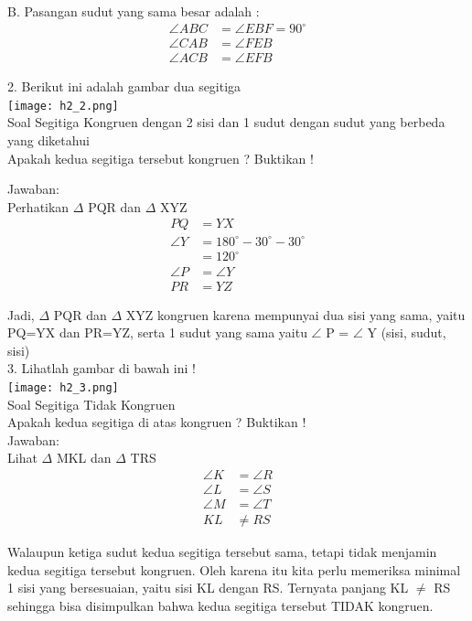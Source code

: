 \documentclass[11pt,fleqn]{book} %
\begin{document}
B. Pasangan sudut yang sama besar adalah :
    \begin{align*} \angle ABC &= \angle EBF = 90^{\circ} \\ \angle CAB &= \angle FEB \\ \angle ACB &= \angle EFB \end{align*}


2. Berikut ini adalah gambar dua segitiga\\
\texttt{[image: h2\_2.png]}\\
Soal Segitiga Kongruen dengan 2 sisi dan 1 sudut dengan sudut yang berbeda yang diketahui\\
Apakah kedua segitiga tersebut kongruen ? Buktikan !

Jawaban:\\
Perhatikan $\Delta$ PQR dan $\Delta$ XYZ\\
    \begin{align*} PQ &= YX \\ \angle Y &= 180^{\circ} - 30^{\circ} - 30^{\circ} \\ &= 120^{\circ} \\ \angle P &= \angle Y \\ PR &= YZ \end{align*}

Jadi, $\Delta$ PQR dan $\Delta$ XYZ kongruen karena mempunyai dua sisi yang sama, yaitu PQ=YX dan PR=YZ, serta 1 sudut yang sama yaitu $\angle$ P = $\angle$ Y (sisi, sudut, sisi)\\


3. Lihatlah gambar di bawah ini !\\
\texttt{[image: h2\_3.png]}\\
Soal Segitiga Tidak Kongruen\\
Apakah kedua segitiga di atas kongruen ? Buktikan !\\

Jawaban:\\
Lihat $\Delta$ MKL dan $\Delta$ TRS\\
    \begin{align*} \angle K &= \angle R \\ \angle L &= \angle S \\ \angle M &= \angle T \\ KL &\neq RS \end{align*}

Walaupun ketiga sudut kedua segitiga tersebut sama, tetapi tidak menjamin kedua segitiga tersebut kongruen. Oleh karena itu kita perlu memeriksa minimal 1 sisi yang bersesuaian, yaitu sisi KL dengan RS. Ternyata panjang KL $\neq$ RS sehingga bisa disimpulkan bahwa kedua segitiga tersebut TIDAK kongruen.\\
\end{document}
